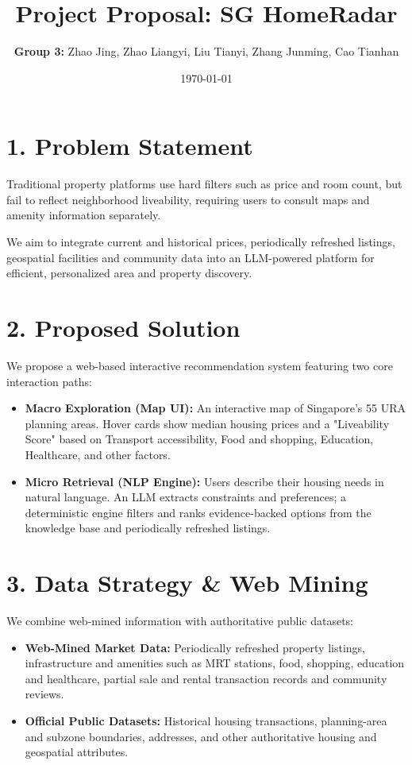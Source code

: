 \documentclass[10pt, a4paper]{article}
\title{\vspace{-2cm}\textbf{\color{primary}Project Proposal: SG HomeRadar}\\
}
\author{\textbf{Group 3:} Zhao Jing, Zhao Liangyi, Liu Tianyi, Zhang Junming, Cao Tianhan}
\date{\today}
\begin{document}
\maketitle
\thispagestyle{empty}
\vspace{-0.5cm} %

\section*{1. Problem Statement}
Traditional property platforms use hard filters such as price and room count, but fail to reflect neighborhood liveability, requiring users to consult maps and amenity information separately.

We aim to integrate current and historical prices, periodically refreshed listings, geospatial facilities and community data into an LLM-powered platform for efficient, personalized area and property discovery.


\section*{2. Proposed Solution}
We propose a web-based interactive recommendation system featuring two core interaction paths:
\begin{itemize}[itemsep=2pt, parsep=0pt]
    \item \textbf{Macro Exploration (Map UI):} An interactive map of Singapore's 55 URA planning areas. Hover cards show median housing prices and a "Liveability Score" based on Transport accessibility, Food and shopping, Education, Healthcare, and other factors.
    \item \textbf{Micro Retrieval (NLP Engine):} Users describe their housing needs in natural language. An LLM extracts constraints and preferences; a deterministic engine filters and ranks evidence-backed options from the knowledge base and periodically refreshed listings.
\end{itemize}

\section*{3. Data Strategy \& Web Mining}
We combine web-mined information with authoritative public datasets:
\begin{itemize}[itemsep=2pt, parsep=0pt]
    \item \textbf{Web-Mined Market Data:} Periodically refreshed property listings, infrastructure and amenities such as MRT stations, food, shopping, education and healthcare, partial sale and rental transaction records and community reviews.
    \item \textbf{Official Public Datasets:} Historical housing transactions, planning-area and subzone boundaries, addresses, and other authoritative housing and geospatial attributes.
\end{itemize}
\end{document}
